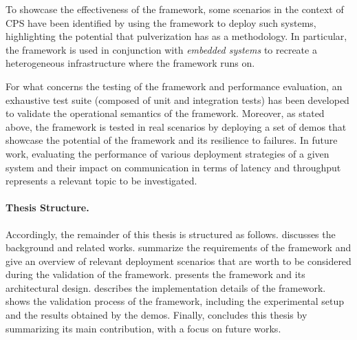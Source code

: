To showcase the effectiveness of the framework, some scenarios in the context of CPS have been identified by using the framework to deploy such
systems, highlighting the potential that pulverization has as a methodology.
In particular, the framework is used in conjunction with \emph{embedded systems} to recreate a heterogeneous infrastructure where the framework
runs on.

For what concerns the testing of the framework and performance evaluation, an exhaustive test suite (composed of unit and integration tests) has been
developed to validate the operational semantics of the framework.
Moreover, as stated above, the framework is tested in real scenarios by deploying a set of demos that showcase the potential of the framework and its
resilience to failures.
In future work, evaluating the performance of various deployment strategies of a given system and their impact on communication in terms of latency 
and throughput represents a relevant topic to be investigated.

%
\paragraph{Thesis Structure.} %
%
Accordingly, the remainder of this thesis is structured as follows.
%
 discusses the background and related works.
%
 summarize the requirements of the framework and give an overview of relevant deployment scenarios that are worth
to be considered during the validation of the framework.
%
 presents the framework and its architectural design.
%
 describes the implementation details of the framework.
%
 shows the validation process of the framework, including the experimental setup and the results obtained by the demos.
%
Finally,  concludes this thesis by summarizing its main contribution, with a focus on future works.

